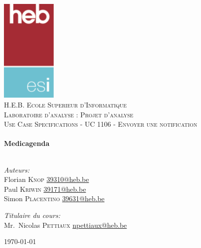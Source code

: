 \begin{titlepage}
	\begin{center}

		\includegraphics[keepaspectratio=true,width=0.20\textwidth]{../ressources/logo}\\[1cm]

		\textsc{\LARGE H.E.B. Ecole Superieur d'Informatique}\\[1.5cm]

		\textsc{\Large Laboratoire d'analyse : Projet d'analyse}\\[0.5cm]
		\textsc{\Large Use Case Specifications - UC 1106 - Envoyer une
		notification}\\[0.5cm]

		\HRule \\[0.4cm]
		{\huge \bfseries Medicagenda \\[0.4cm]}
		\HRule \\[1.5cm]

		\noindent
		\begin{minipage}[t]{0.4\textwidth}
			\begin{flushleft} \large
				\emph{Auteurs:}\\
				Florian \textsc{Knop} \href{mailto:39310@heb.be}{39310@heb.be}\\
				Paul \textsc{Kriwin} \href{mailto:39171@heb.be}{39171@heb.be}\\
				Simon \textsc{Placentino} \href{mailto:39631@heb.be}{39631@heb.be}\
			\end{flushleft}
		\end{minipage}%
		\begin{minipage}[t]{0.4\textwidth}
			\begin{flushright} \large
				\emph{Titulaire du cours:} \\
				Mr.~Nicolas \textsc{Pettiaux}
				\href{mailto:npettiaux@heb.be}{npettiaux@heb.be}
			\end{flushright}
		\end{minipage}

		\vfill

		{\large \today}

	\end{center}
	\clearpage\null\newpage
\end{titlepage}
